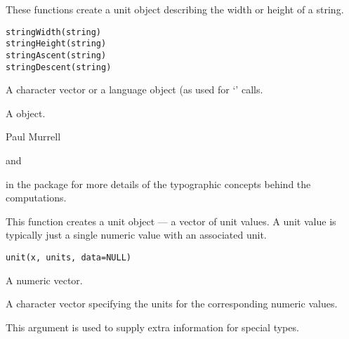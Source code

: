 %
\begin{Description}\relax
These functions create a unit object describing the width or height of
a string.
\end{Description}
%
\begin{Usage}
\begin{verbatim}
stringWidth(string)
stringHeight(string)
stringAscent(string)
stringDescent(string)
\end{verbatim}
\end{Usage}
%
\begin{Arguments}
\begin{ldescription}
\item[\code{string}] A character vector or a language object (as used for
`' calls.
\end{ldescription}
\end{Arguments}
%
\begin{Value}
A  object.
\end{Value}
%
\begin{Author}\relax
Paul Murrell
\end{Author}
%
\begin{SeeAlso}\relax
{} and

 in the  package for more details of the
typographic concepts behind the computations.
\end{SeeAlso}
%
\begin{Description}\relax
This function creates a unit object --- a vector of unit values.
A unit value is typically just a single numeric value with an
associated unit.
\end{Description}
%
\begin{Usage}
\begin{verbatim}
unit(x, units, data=NULL)
\end{verbatim}
\end{Usage}
%
\begin{Arguments}
\begin{ldescription}
\item[\code{x}] A numeric vector.
\item[\code{units}] A character vector specifying the units for the
corresponding numeric values.
\item[\code{data}] This argument is used to supply extra information
for special  types.
\end{ldescription}
\end{Arguments}
